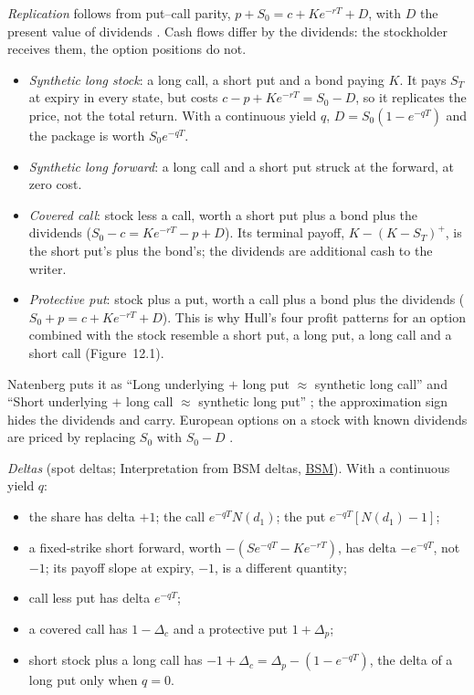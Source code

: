 \begin{qfmethod}\label{meth:option-replication-deltas}
 \emph{Replication} follows from put--call parity, $p+S_0=c+Ke^{-rT}+D$, with $D$ the present value of dividends \citep[chap.~12, sec.~12.2, eq.~(12.1), pp.~270--272]{s7-hulloptions}.
Cash flows differ by the dividends: the stockholder receives them, the option positions do not.
\begin{itemize}
\item \emph{Synthetic long stock}: a long call, a short put and a bond paying $K$. It pays $S_T$ at expiry in every state, but costs $c-p+Ke^{-rT}=S_0-D$, so it replicates the price, not the total return. With a continuous yield $q$, $D=S_0(1-e^{-qT})$ and the package is worth $S_0e^{-qT}$.
\item \emph{Synthetic long forward}: a long call and a short put struck at the forward, at zero cost.
\item \emph{Covered call}: stock less a call, worth a short put plus a bond plus the dividends ($S_0-c=Ke^{-rT}-p+D$). Its terminal payoff, $K-(K-S_T)^+$, is the short put's plus the bond's; the dividends are additional cash to the writer.
\item \emph{Protective put}: stock plus a put, worth a call plus a bond plus the dividends ($S_0+p=c+Ke^{-rT}+D$). This is why Hull's four profit patterns for an option combined with the stock resemble a short put, a long put, a long call and a short call (Figure~12.1).
\end{itemize}
Natenberg puts it as ``Long underlying $+$ long put $\approx$ synthetic long call'' and ``Short underlying $+$ long call $\approx$ synthetic long put'' \citep[chap.~17, p.~325]{s7-natenberg}; the approximation sign hides the dividends and carry. European options on a stock with known dividends are priced by replacing $S_0$ with $S_0-D$ \citep[chap.~15, sec.~15.12, p.~360]{s7-hulloptions}.

\emph{Deltas} (spot deltas; Interpretation from BSM deltas, \hyperref[mod:black-scholes-merton]{BSM}). With a continuous yield $q$:
\begin{itemize}
\item the share has delta $+1$; the call $e^{-qT}N(d_1)$; the put $e^{-qT}[N(d_1)-1]$;
\item a fixed-strike short forward, worth $-(Se^{-qT}-Ke^{-rT})$, has delta $-e^{-qT}$, not $-1$; its payoff slope at expiry, $-1$, is a different quantity;
\item call less put has delta $e^{-qT}$;
\item a covered call has $1-\Delta_c$ and a protective put $1+\Delta_p$;
\item short stock plus a long call has $-1+\Delta_c=\Delta_p-(1-e^{-qT})$, the delta of a long put only when $q=0$.
\end{itemize}


\end{qfmethod}
